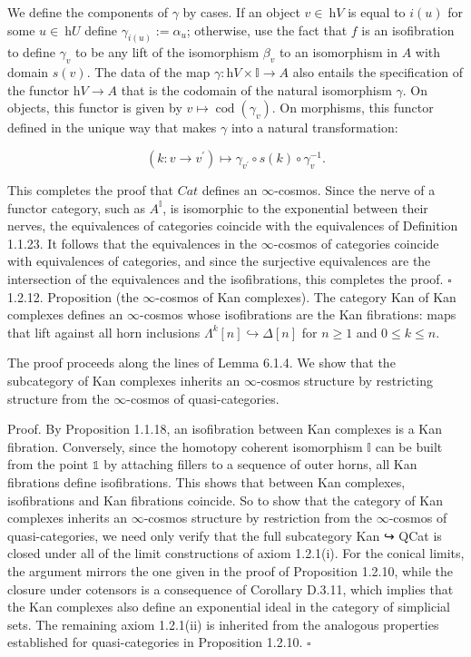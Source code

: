 \documentclass[10pt]{article}
\begin{document}
We define the components of $\gamma$ by cases. If an object $v \in \mathrm{~h} V$ is equal to $i(u)$ for some $u \in \mathrm{~h} U$ define $\gamma_{i(u)}:=\alpha_{u}$; otherwise, use the fact that $f$ is an isofibration to define $\gamma_{v}$ to be any lift of the isomorphism $\beta_{v}$ to an isomorphism in $A$ with domain $s(v)$. The data of the map $\gamma: \mathrm{h} V \times \mathbb{I} \rightarrow A$ also entails the specification of the functor $\mathrm{h} V \rightarrow A$ that is the codomain of the natural isomorphism $\gamma$. On objects, this functor is given by $v \mapsto \operatorname{cod}\left(\gamma_{v}\right)$. On morphisms, this functor defined in the unique way that makes $\gamma$ into a natural transformation:

$$
\left(k: v \rightarrow v^{\prime}\right) \mapsto \gamma_{v^{\prime}} \circ s(k) \circ \gamma_{v}^{-1} .
$$

This completes the proof that $C a t$ defines an $\infty$-cosmos. Since the nerve of a functor category, such as $A^{\mathbb{I}}$, is isomorphic to the exponential between their nerves, the equivalences of categories coincide with the equivalences of Definition 1.1.23. It follows that the equivalences in the $\infty$-cosmos of categories coincide with equivalences of categories, and since the surjective equivalences are the intersection of the equivalences and the isofibrations, this completes the proof. \(\square\)\\
1.2.12. Proposition (the $\infty$-cosmos of Kan complexes). The category Kan of Kan complexes defines an $\infty$-cosmos whose isofibrations are the Kan fibrations: maps that lift against all horn inclusions $\Lambda^{k}[n] \hookrightarrow \Delta[n]$ for $n \geq 1$ and $0 \leq k \leq n$.

The proof proceeds along the lines of Lemma 6.1.4. We show that the subcategory of Kan complexes inherits an $\infty$-cosmos structure by restricting structure from the $\infty$-cosmos of quasi-categories.

Proof. By Proposition 1.1.18, an isofibration between Kan complexes is a Kan fibration. Conversely, since the homotopy coherent isomorphism $\mathbb{I}$ can be built from the point $\mathbb{1}$ by attaching fillers to a sequence of outer horns, all Kan fibrations define isofibrations. This shows that between Kan complexes, isofibrations and Kan fibrations coincide. So to show that the category of Kan complexes inherits an $\infty$-cosmos structure by restriction from the $\infty$-cosmos of quasi-categories, we need only verify that the full subcategory Kan ↪ QCat is closed under all of the limit constructions of axiom 1.2.1(i). For the conical limits, the argument mirrors the one given in the proof of Proposition 1.2.10, while the closure under cotensors is a consequence of Corollary D.3.11, which implies that the Kan complexes also define an exponential ideal in the category of simplicial sets. The remaining axiom 1.2.1(ii) is inherited from the analogous properties established for quasi-categories in Proposition 1.2.10. \(\square\)
\end{document}
